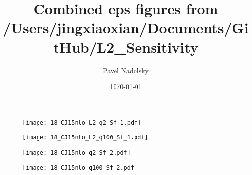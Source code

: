 \documentclass[10pt,aps,prd,floatfix,titlepage]{revtex4}
\begin{document}
\title{Combined eps figures from /Users/jingxiaoxian/Documents/GitHub/L2\_Sensitivity}
\date{\today}
\author{Pavel Nadolsky}
\maketitle
\begin{figure}
\texttt{[image: 18\_CJ15nlo\_L2\_q2\_Sf\_1.pdf]}
\caption{}
\end{figure}
\begin{figure}
\texttt{[image: 18\_CJ15nlo\_L2\_q100\_Sf\_1.pdf]}
\caption{}
\end{figure}
\clearpage
\begin{figure}
\texttt{[image: 18\_CJ15nlo\_q2\_Sf\_2.pdf]}
\caption{}
\end{figure}
\begin{figure}
\texttt{[image: 18\_CJ15nlo\_q100\_Sf\_2.pdf]}
\caption{}
\end{figure}
\clearpage
\end{document}
